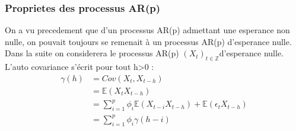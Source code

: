 \documentclass[11pt]{scrartcl} %
\newcommand{\Xt}{$\left(X_t\right)_{t\in\mathbb{Z}}$}
\begin{document}
\subsubsection{Proprietes des processus AR(p)}
On a vu precedement que d'un processus AR(p) admettant une esperance non nulle, on pouvait toujours se remenait à un processus AR(p) d'esperance nulle. Dans la suite on considerera le processus AR(p) \Xt d'esperance nulle. L'auto covariance s'écrit pour tout h>0 : 
\begin{align*}
\gamma(h)&= Cov(X_t,X_{t-h})\\
&= \mathbb{E}\left(X_tX_{t-h}\right)\\
&= \sum_{i=1}^p\phi_i\mathbb{E}\left(X_{t-i}X_{t-h}\right)+\mathbb{E}\left(\epsilon_tX_{t-h}\right)\\
&= \sum_{i=1}^p\phi_i\gamma(h-i)
\end{align*}
\end{document}
